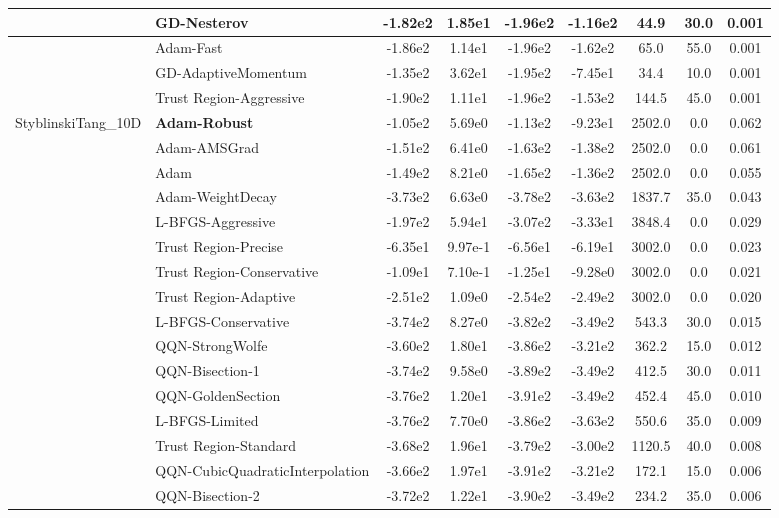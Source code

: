 \documentclass{article}
\begin{document}
\begin{longtable}{|l|l|c|c|c|c|c|c|c|}
\hline
 & GD-Nesterov & -1.82e2 & 1.85e1 & -1.96e2 & -1.16e2 & 44.9 & 30.0 & 0.001 \\
\hline
 & Adam-Fast & -1.86e2 & 1.14e1 & -1.96e2 & -1.62e2 & 65.0 & 55.0 & 0.001 \\
\hline
 & GD-AdaptiveMomentum & -1.35e2 & 3.62e1 & -1.95e2 & -7.45e1 & 34.4 & 10.0 & 0.001 \\
\hline
 & Trust Region-Aggressive & -1.90e2 & 1.11e1 & -1.96e2 & -1.53e2 & 144.5 & 45.0 & 0.001 \\
StyblinskiTang\_10D & \textbf{Adam-Robust} & -1.05e2 & 5.69e0 & -1.13e2 & -9.23e1 & 2502.0 & 0.0 & 0.062 \\
\hline
 & Adam-AMSGrad & -1.51e2 & 6.41e0 & -1.63e2 & -1.38e2 & 2502.0 & 0.0 & 0.061 \\
\hline
 & Adam & -1.49e2 & 8.21e0 & -1.65e2 & -1.36e2 & 2502.0 & 0.0 & 0.055 \\
\hline
 & Adam-WeightDecay & -3.73e2 & 6.63e0 & -3.78e2 & -3.63e2 & 1837.7 & 35.0 & 0.043 \\
\hline
 & L-BFGS-Aggressive & -1.97e2 & 5.94e1 & -3.07e2 & -3.33e1 & 3848.4 & 0.0 & 0.029 \\
\hline
 & Trust Region-Precise & -6.35e1 & 9.97e-1 & -6.56e1 & -6.19e1 & 3002.0 & 0.0 & 0.023 \\
\hline
 & Trust Region-Conservative & -1.09e1 & 7.10e-1 & -1.25e1 & -9.28e0 & 3002.0 & 0.0 & 0.021 \\
\hline
 & Trust Region-Adaptive & -2.51e2 & 1.09e0 & -2.54e2 & -2.49e2 & 3002.0 & 0.0 & 0.020 \\
\hline
 & L-BFGS-Conservative & -3.74e2 & 8.27e0 & -3.82e2 & -3.49e2 & 543.3 & 30.0 & 0.015 \\
\hline
 & QQN-StrongWolfe & -3.60e2 & 1.80e1 & -3.86e2 & -3.21e2 & 362.2 & 15.0 & 0.012 \\
\hline
 & QQN-Bisection-1 & -3.74e2 & 9.58e0 & -3.89e2 & -3.49e2 & 412.5 & 30.0 & 0.011 \\
\hline
 & QQN-GoldenSection & -3.76e2 & 1.20e1 & -3.91e2 & -3.49e2 & 452.4 & 45.0 & 0.010 \\
\hline
 & L-BFGS-Limited & -3.76e2 & 7.70e0 & -3.86e2 & -3.63e2 & 550.6 & 35.0 & 0.009 \\
\hline
 & Trust Region-Standard & -3.68e2 & 1.96e1 & -3.79e2 & -3.00e2 & 1120.5 & 40.0 & 0.008 \\
\hline
 & QQN-CubicQuadraticInterpolation & -3.66e2 & 1.97e1 & -3.91e2 & -3.21e2 & 172.1 & 15.0 & 0.006 \\
\hline
 & QQN-Bisection-2 & -3.72e2 & 1.22e1 & -3.90e2 & -3.49e2 & 234.2 & 35.0 & 0.006 \\

\end{longtable}
\end{document}
